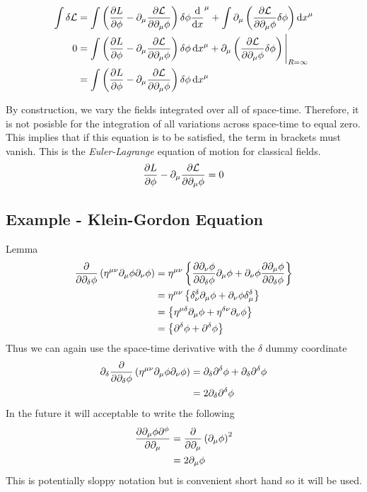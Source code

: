 \begin{align}
    \int\mathcal{\delta L} &= \int\left( \pdv{L}{\phi} - \partial_\mu\pdv{\mathcal{L}}{\partial_\mu\phi} \right)\delta\phi\dv{x}^\mu + \int\partial_\mu\left( \pdv{\mathcal{L}}{\partial_\mu\phi} \delta\phi\right)\dd{x}^\mu \\
    0 &= \int\left( \pdv{L}{\phi} - \partial_\mu\pdv{\mathcal{L}}{\partial_\mu\phi} \right)\delta\phi\dd{x}^\mu + \partial_\mu\left( \pdv{\mathcal{L}}{\partial_\mu\phi} \delta\phi\right)\Bigg|_{R=\infty} \\
      &= \int\left( \pdv{L}{\phi} - \partial_\mu\pdv{\mathcal{L}}{\partial_\mu\phi} \right)\delta\phi\dd{x}^\mu
\end{align}

By construction, we vary the fields integrated over all of space-time. Therefore, it is not posisble for
the integration of all variations across space-time to equal zero. This implies that if this equation is
to be satisfied, the term in brackets must vanish. This is the \textit{Euler-Lagrange} equation of motion
for classical fields.
\begin{equation}
    \pdv{L}{\phi} - \partial_\mu\pdv{\mathcal{L}}{\partial_\mu\phi} = 0
\end{equation}

\subsection{Example - Klein-Gordon Equation}
Lemma
\begin{align}
    \pdv{\partial_\delta \phi} \left( \eta^{\mu\nu} \partial_\mu\phi \partial_\nu\phi \right) &= \eta^{\mu\nu}\left\{ \pdv{\partial_\nu\phi}{\partial_\delta\phi}\partial_\mu\phi + \partial_\nu\phi\pdv{\partial_\mu\phi}{\partial_\delta\phi} \right\} \\
     &= \eta^{\mu\nu}\left\{ \delta^\delta_\nu\partial_\mu\phi + \partial_\nu\phi\delta^\delta_\mu \right\} \\
     &= \left\{ \eta^{\mu\delta}\partial_\mu\phi + \eta^{\delta\nu}\partial_\nu\phi \right\} \\
     &= \left\{ \partial^\delta\phi + \partial^\delta\phi \right\}
\end{align}
Thus we can again use the space-time derivative with the $\delta$ dummy coordinate
\begin{align}
    \partial_\delta\pdv{\partial_\delta \phi} \left( \eta^{\mu\nu} \partial_\mu\phi \partial_\nu\phi \right) &= \partial_\delta\partial^\delta\phi + \partial_\delta\partial^\delta\phi \\
    &= 2\partial_\delta\partial^\delta\phi
\end{align}
In the future it will acceptable to write the following
\begin{align}
    \pdv{\partial_\mu\phi\partial^\phi}{\partial_\mu} &= \pdv{\partial_\mu}\left( \partial_\mu\phi \right)^2 \\
                                                      &= 2\partial_\mu\phi
\end{align}
This is potentially sloppy notation but is convenient short hand so it will be used.

